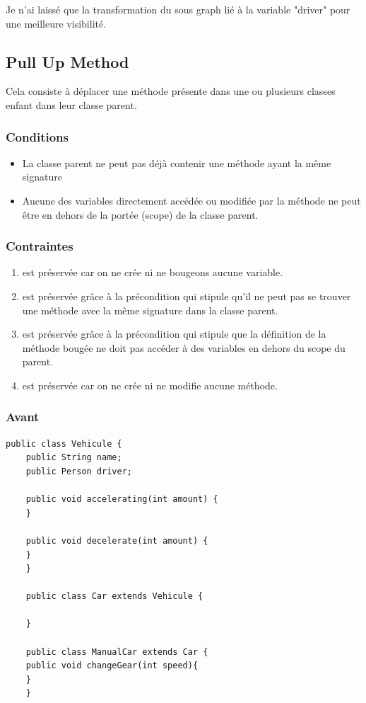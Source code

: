 \documentclass[a4paper, 12pt]{article}
\begin{document}
  Je n'ai laissé que la transformation du sous graph lié à la variable "driver" pour une meilleure visibilité.

  \subsection{Pull Up Method}

  Cela consiste à déplacer une méthode présente dans une ou plusieurs classes enfant dans leur classe parent.

  \subsubsection{Conditions}

  \begin{itemize}[label=\textbullet]
    \item La classe parent ne peut pas déjà contenir une méthode ayant la même signature
    \item Aucune des variables directement accédée ou modifiée par la méthode ne peut être en dehors de la portée (scope) de la classe parent.
  \end{itemize}

  \subsubsection{Contraintes}

  \begin{enumerate}
    \item est préservée car on ne crée ni ne bougeons aucune variable.
    \item est préservée grâce à la précondition qui stipule qu'il ne peut pas se trouver une méthode avec la même signature dans la classe parent.
    \item est préservée grâce à la précondition qui stipule que la définition de la méthode bougée ne doit pas accéder à des variables en dehors du scope du parent.
    \item est préservée car on ne crée ni ne modifie aucune méthode.
  \end{enumerate}

  \subsubsection{Avant}
  \begin{lstlisting}[frame=single]
    public class Vehicule {
    public String name;
    public Person driver;

    public void accelerating(int amount) {
    }

    public void decelerate(int amount) {
    }
    }

    public class Car extends Vehicule {

    }

    public class ManualCar extends Car {
    public void changeGear(int speed){
    }
    }
  \end{lstlisting}
\end{document}
